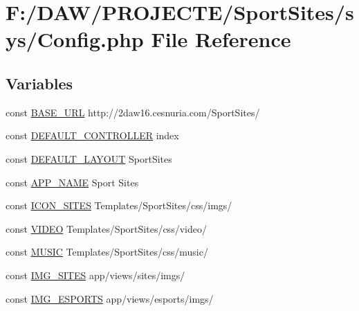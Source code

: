 \hypertarget{_config_8php}{}\section{F\+:/\+D\+A\+W/\+P\+R\+O\+J\+E\+C\+T\+E/\+Sport\+Sites/sys/\+Config.php File Reference}
\label{_config_8php}
\subsection*{Variables}
\begin{DoxyCompactItemize}
\item 
const \hyperlink{_config_8php_ac2f7c46cdf071163a82cb95295eca57f}{B\+A\+S\+E\+\_\+\+U\+R\+L} \textquotesingle{}http\+://2daw16.\+cesnuria.\+com/\+Sport\+Sites/\textquotesingle{}
\item 
const \hyperlink{_config_8php_ae05204cd87e8b77b35a92c595e4d897a}{D\+E\+F\+A\+U\+L\+T\+\_\+\+C\+O\+N\+T\+R\+O\+L\+L\+E\+R} \textquotesingle{}index\textquotesingle{}
\item 
const \hyperlink{_config_8php_a2a1a79da0bc551583b2718abfed84c1d}{D\+E\+F\+A\+U\+L\+T\+\_\+\+L\+A\+Y\+O\+U\+T} \textquotesingle{}Sport\+Sites\textquotesingle{}
\item 
const \hyperlink{_config_8php_aec1351293f88691205169becf08d525d}{A\+P\+P\+\_\+\+N\+A\+M\+E} \textquotesingle{}Sport Sites\textquotesingle{}
\item 
const \hyperlink{_config_8php_a867884a826bd65afb6be9a359fcfa74e}{I\+C\+O\+N\+\_\+\+S\+I\+T\+E\+S} \textquotesingle{}Templates/Sport\+Sites/css/imgs/\textquotesingle{}
\item 
const \hyperlink{_config_8php_a333a9b0a1034beea1b4b505f30885cea}{V\+I\+D\+E\+O} \textquotesingle{}Templates/Sport\+Sites/css/video/\textquotesingle{}
\item 
const \hyperlink{_config_8php_ab3669e89acae53a0fdcf3da518439b8e}{M\+U\+S\+I\+C} \textquotesingle{}Templates/Sport\+Sites/css/music/\textquotesingle{}
\item 
const \hyperlink{_config_8php_a40fa0c01367294ae479cd4d65b913ef7}{I\+M\+G\+\_\+\+S\+I\+T\+E\+S} \textquotesingle{}app/views/sites/imgs/\textquotesingle{}
\item 
const \hyperlink{_config_8php_a350c702b2487f6d464b653d9045a7fcb}{I\+M\+G\+\_\+\+E\+S\+P\+O\+R\+T\+S} \textquotesingle{}app/views/esports/imgs/\textquotesingle{}
\item 

\end{DoxyCompactItemize}
